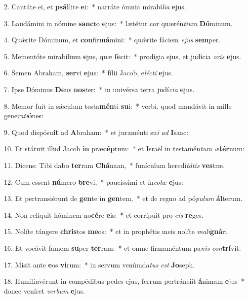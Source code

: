 2. Cantáte ei, et \textbf{psál}lite \textbf{e}i:~*  narráte ómnia mirabí\textit{li}\textit{a} \textbf{e}jus.\

3. Laudámini in nómine \textbf{sanc}to \textbf{e}jus:~*  lætétur cor quærén\textit{ti}\textit{um} \textbf{Dó}minum.\

4. Quǽrite Dóminum, et \textbf{con}fir\textbf{má}mini:~*  quǽrite fáciem \textit{e}\textit{jus} \textbf{sem}per.\

5. Mementóte mirabílium \textbf{e}jus, quæ \textbf{fe}cit:~*  prodígia ejus, et judícia \textit{o}\textit{ris} \textbf{e}jus.\

6. Semen Abraham, \textbf{ser}vi \textbf{e}jus:~*  fílii Jacob, e\textit{léc}\textit{ti} \textbf{e}jus.\

7. Ipse Dóminus \textbf{De}us \textbf{nos}ter:~*  in univérsa terra judí\textit{ci}\textit{a} \textbf{e}jus.\

8. Memor fuit in sǽculum testa\textbf{mén}ti \textbf{su}i:~*  verbi, quod mandávit in mille gene\textit{ra}\textit{ti}\textbf{ó}nes:\

9. Quod dispósu\textbf{it} ad \textbf{A}braham:~*  et juraménti su\textit{i} \textit{ad} \textbf{I}saac:\

10. Et státuit illud Jacob \textbf{in} præ\textbf{cép}tum:~*  et Israël in testamén\textit{tum} \textit{æ}\textbf{tér}num:\

11. Dicens: Tibi dabo \textbf{ter}ram \textbf{Chá}naan,~*  funículum heredi\textit{tá}\textit{tis} \textbf{ves}træ.\

12. Cum essent \textbf{nú}mero \textbf{bre}vi,~*  paucíssimi et ín\textit{co}\textit{læ} \textbf{e}jus:\

13. Et pertransiérunt de \textbf{gen}te in \textbf{gen}tem,~*  et de regno ad pó\textit{pu}\textit{lum} \textbf{ál}terum.\

14. Non relíquit hóminem no\textbf{cé}re \textbf{e}is:~*  et corrípuit pro \textit{e}\textit{is} \textbf{re}ges.\

15. Nolíte tángere \textbf{chris}tos \textbf{me}os:~*  et in prophétis meis nolíte \textit{ma}\textit{li}\textbf{gná}ri.\

16. Et vocávit famem \textbf{su}per \textbf{ter}ram:~*  et omne firmaméntum pa\textit{nis} \textit{con}\textbf{trí}vit.\

17. Misit ante \textbf{e}os \textbf{vi}rum:~*  in servum venúmda\textit{tus} \textit{est} \textbf{Jo}seph.\

18. Humiliavérunt in compédibus pedes ejus, ferrum pertránsiit \textbf{á}nimam \textbf{e}jus~*  donec veníret \textit{ver}\textit{bum} \textbf{e}jus.\

